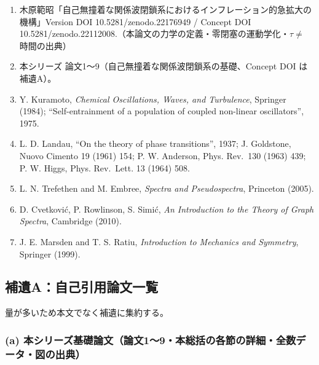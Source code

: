 \documentclass[
  a4paper,
]{ltjsarticle}
\providecommand{\tightlist}{%
  \setlength{\itemsep}{0pt}\setlength{\parskip}{0pt}}
\begin{document}
\begin{enumerate}
\def\labelenumi{\arabic{enumi}.}
\tightlist
\item
  木原範昭「自己無撞着な関係波閉鎖系におけるインフレーション的急拡大の機構」Version
  DOI 10.5281/zenodo.22176949 / Concept DOI
  10.5281/zenodo.22112008.（本論文の力学の定義・零閉塞の運動学化・\(\tau\neq\)
  時間の出典）
\item
  本シリーズ 論文1〜9（自己無撞着な関係波閉鎖系の基礎、Concept DOI
  は補遺A）。
\item
  Y. Kuramoto, \emph{Chemical Oscillations, Waves, and Turbulence},
  Springer (1984); ``Self-entrainment of a population of coupled
  non-linear oscillators'', 1975.
\item
  L. D. Landau, ``On the theory of phase transitions'', 1937; J.
  Goldstone, Nuovo Cimento 19 (1961) 154; P. W. Anderson, Phys. Rev.~130
  (1963) 439; P. W. Higgs, Phys. Rev.~Lett. 13 (1964) 508.
\item
  L. N. Trefethen and M. Embree, \emph{Spectra and Pseudospectra},
  Princeton (2005).
\item
  D. Cvetković, P. Rowlinson, S. Simić, \emph{An Introduction to the
  Theory of Graph Spectra}, Cambridge (2010).
\item
  J. E. Marsden and T. S. Ratiu, \emph{Introduction to Mechanics and
  Symmetry}, Springer (1999).
\end{enumerate}

\subsection{補遺A：自己引用論文一覧}\label{ux88dcux907aaux81eaux5df1ux5f15ux7528ux8ad6ux6587ux4e00ux89a7}

量が多いため本文でなく補遺に集約する。

\subsubsection{(a)
本シリーズ基礎論文（論文1〜9・本総括の各節の詳細・全数データ・図の出典）}\label{a-ux672cux30b7ux30eaux30fcux30baux57faux790eux8ad6ux6587ux8ad6ux658719ux672cux7dcfux62ecux306eux5404ux7bc0ux306eux8a73ux7d30ux5168ux6570ux30c7ux30fcux30bfux56f3ux306eux51faux5178}
\end{document}
